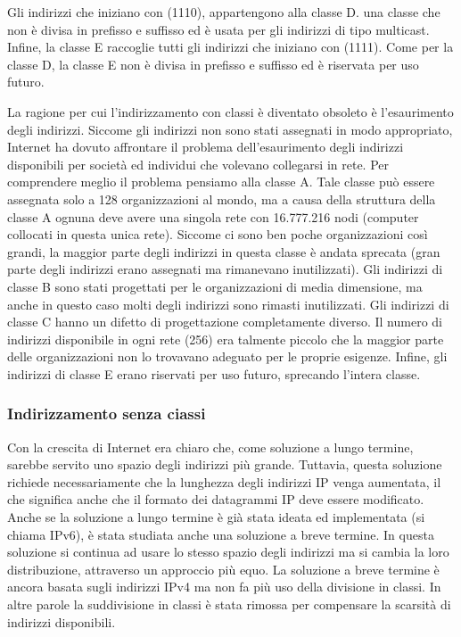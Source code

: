 Gli indirizzi che iniziano con (1110), appartengono alla classe D. una classe che non è divisa in prefisso e suffisso ed è usata per gli indirizzi di tipo multicast. Infine, la classe E raccoglie tutti gli indirizzi che iniziano con (1111). Come per la classe D, la classe E non è divisa in prefisso e suffisso ed è riservata per uso futuro.

La ragione per cui l'indirizzamento con classi è diventato obsoleto è l'esaurimento degli indirizzi. Siccome gli indirizzi non sono stati assegnati in modo appropriato, Internet ha dovuto affrontare il problema dell'esaurimento degli indirizzi disponibili per società ed individui che volevano collegarsi in rete. Per comprendere meglio il problema pensiamo alla classe A. Tale classe può essere assegnata solo a 128 organizzazioni al mondo, ma a causa della struttura della classe A ognuna deve avere una singola rete con 16.777.216 nodi (computer collocati in questa unica rete). Siccome ci sono ben poche organizzazioni così grandi, la maggior parte degli indirizzi in questa classe è andata sprecata (gran parte degli indirizzi erano assegnati ma rimanevano inutilizzati). Gli indirizzi di classe B sono stati progettati per le organizzazioni di media dimensione, ma anche in questo caso molti degli indirizzi sono rimasti inutilizzati. Gli indirizzi di classe C hanno un difetto di progettazione completamente diverso. Il numero di indirizzi disponibile in ogni rete (256) era talmente piccolo che la maggior parte delle organizzazioni non lo trovavano adeguato per le proprie esigenze. Infine, gli indirizzi di classe E erano riservati per uso futuro, sprecando l'intera classe.

\subsubsection{Indirizzamento senza ciassi}
Con la crescita di Internet era chiaro che, come soluzione a lungo termine, sarebbe servito uno spazio degli indirizzi più grande. Tuttavia, questa soluzione richiede necessariamente che la lunghezza degli indirizzi IP venga aumentata, il che significa anche che il formato dei datagrammi IP deve essere modificato. Anche se la soluzione a lungo termine è già stata ideata ed implementata (si chiama IPv6), è stata studiata anche una soluzione a breve termine. In questa soluzione si continua ad usare lo stesso spazio degli indirizzi ma si cambia la loro distribuzione, attraverso un approccio più equo. La soluzione a breve termine è ancora basata sugli indirizzi IPv4 ma non fa più uso della divisione in classi. In altre parole la suddivisione in classi è stata rimossa per compensare la scarsità di indirizzi disponibili.

